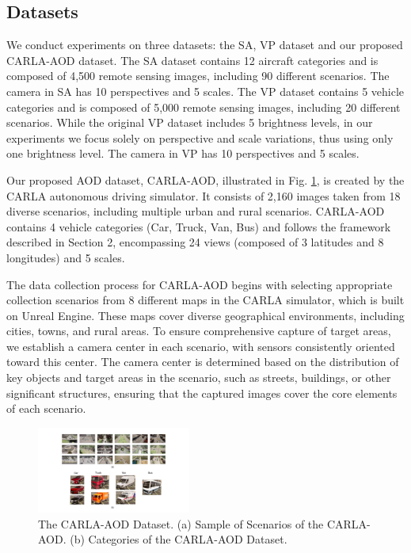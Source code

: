 \documentclass[lettersize,journal]{IEEEtran}
\begin{document}
\subsection{Datasets}

We conduct experiments on three datasets: the SA, VP dataset and our proposed CARLA-AOD dataset. The SA dataset contains 12 aircraft categories and is composed of 4,500 remote sensing images, including 90 different scenarios. The camera in SA has 10 perspectives and 5 scales. The VP dataset contains 5 vehicle categories and is composed of 5,000 remote sensing images, including 20 different scenarios. While the original VP dataset includes 5 brightness levels, in our experiments we focus solely on perspective and scale variations, thus using only one brightness level. The camera in VP has 10 perspectives and 5 scales.

Our proposed AOD dataset, CARLA-AOD, illustrated in Fig. \ref{dataset}, is created by the CARLA autonomous driving simulator. It consists of 2,160 images taken from 18 diverse scenarios, including multiple urban and rural scenarios. CARLA-AOD contains 4 vehicle categories (Car, Truck, Van, Bus) and follows the framework described in Section 2, encompassing 24 views (composed of 3 latitudes and 8 longitudes) and 5 scales.

The data collection process for CARLA-AOD begins with selecting appropriate collection scenarios from 8 different maps in the CARLA simulator, which is built on Unreal Engine. These maps cover diverse geographical environments, including cities, towns, and rural areas. To ensure comprehensive capture of target areas, we establish a camera center in each scenario, with sensors consistently oriented toward this center. The camera center is determined based on the distribution of key objects and target areas in the scenario, such as streets, buildings, or other significant structures, ensuring that the captured images cover the core elements of each scenario.
\begin{figure}[!t]
    \centering
    \includegraphics[width=0.45\textwidth]{fig/dataset.pdf}
    \caption{The CARLA-AOD Dataset. (a) Sample of Scenarios of the CARLA-AOD. (b) Categories of the CARLA-AOD Dataset.}
    \label{dataset}
\end{figure}
\end{document}
